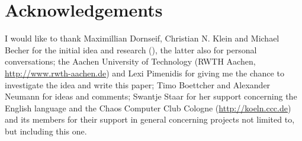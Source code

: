 %
%

\section{Acknowledgements}

I would like to thank Maximillian Dornseif, Christian N. Klein and Michael
Becher for the initial idea and research (\cite{cansecwest_firewire:2005}), the
latter also for personal conversations; the Aachen University of Technology
(RWTH Aachen, \href{http://www.rwth-aachen.de}{http://www.rwth-aachen.de}) and
Lexi Pimenidis for giving me the chance to investigate the idea and write this
paper; Timo Boettcher and Alexander Neumann for ideas and comments; Swantje
Staar for her support concerning the English language and the Chaos Computer
Club Cologne (\href{http://koeln.ccc.de}{http://koeln.ccc.de}) and its members
for their support in general concerning projects not limited to, but including
this one.

